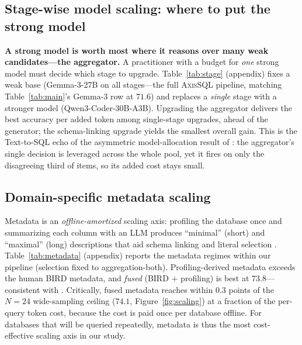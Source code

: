 \documentclass{article}
\newcommand{\sys}{\textsc{AxisSQL}\xspace}
\begin{document}

\subsection{Stage-wise model scaling: where to put the strong model}
\label{sec:stage}

\textbf{A strong model is worth most where it reasons over many weak candidates---the aggregator.} A practitioner with a budget for \emph{one} strong model must decide which stage to upgrade. Table~\ref{tab:stage} (appendix) fixes a weak base (Gemma-3-27B on all stages---the full \sys{} pipeline, matching Table~\ref{tab:main}'s Gemma-3 row at $71.6$) and replaces a \emph{single} stage with a stronger model (Qwen3-Coder-30B-A3B). Upgrading the aggregator delivers the best accuracy per added token among single-stage upgrades, ahead of the generator; the schema-linking upgrade yields the smallest overall gain. This is the Text-to-SQL echo of the asymmetric model-allocation result of \citet{lee2026aggagent}: the aggregator's single decision is leveraged across the whole pool, yet it fires on only the disagreeing third of items, so its added cost stays small.


\subsection{Domain-specific metadata scaling}
\label{sec:metadata}

Metadata is an \emph{offline-amortized} scaling axis: profiling the database once and summarizing each column with an LLM produces ``minimal'' (short) and ``maximal'' (long) descriptions that aid schema linking and literal selection \citep{shkapenyuk2025metadata}. Table~\ref{tab:metadata} (appendix) reports the metadata regimes within our pipeline (selection fixed to aggregation-both). Profiling-derived metadata exceeds the human BIRD metadata, and \emph{fused} (BIRD $+$ profiling) is best at $73.8$---consistent with \citet{shkapenyuk2025metadata}. Critically, fused metadata reaches within $0.3$ points of the $N{=}24$ wide-sampling ceiling ($74.1$, Figure~\ref{fig:scaling}) at a fraction of the per-query token cost, because the cost is paid once per database offline. For databases that will be queried repeatedly, metadata is thus the most cost-effective scaling axis in our study.

\end{document}
